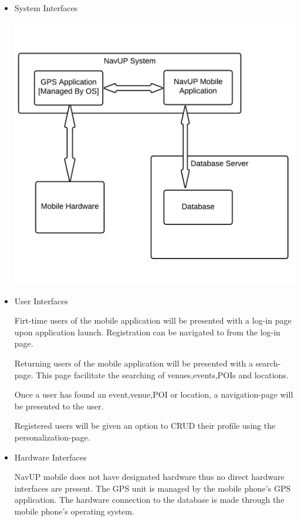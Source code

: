\documentclass{article}
\begin{document}
		\begin{itemize}
		    \pagebreak
			\item System Interfaces
			
			\includegraphics[scale=.7]{blockDiagramSystemInterface}
			\item User Interfaces
			
			Firt-time users of the mobile application will be presented with a log-in page upon application launch. Registration can be navigated to from the log-in page.
			
			Returning users of the mobile application will be presented with a search-page. This page facilitate the searching of venues,events,POIs and locations.
			
			Once a user has found an event,venue,POI or location, a navigation-page will be presented to the user.
			
			Registered users will be given an option to CRUD their profile using the personalization-page.
			
			
			\item Hardware Interfaces
			
			NavUP mobile does not have designated hardware thus no direct hardware interfaces are present. The GPS unit is managed by the mobile phone's GPS application. The hardware connection to the database is made through the mobile phone's operating system.
			

\end{itemize}
\end{document}
